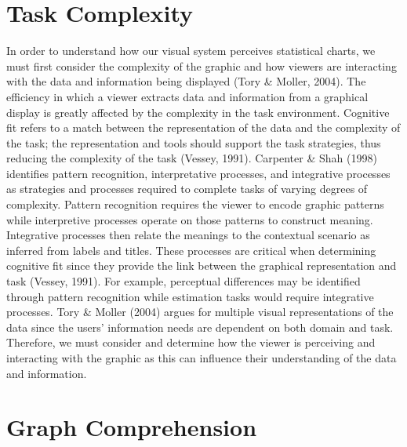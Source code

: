 \documentclass[print]{nuthesis}
\begin{document}
\hypertarget{task-complexity}{%
\section{Task Complexity}\label{task-complexity}}

In order to understand how our visual system perceives statistical charts, we must first consider the complexity of the graphic and how viewers are interacting with the data and information being displayed (Tory \& Moller, 2004).
The efficiency in which a viewer extracts data and information from a graphical display is greatly affected by the complexity in the task environment.
Cognitive fit refers to a match between the representation of the data and the complexity of the task; the representation and tools should support the task strategies, thus reducing the complexity of the task (Vessey, 1991).
Carpenter \& Shah (1998) identifies pattern recognition, interpretative processes, and integrative processes as strategies and processes required to complete tasks of varying degrees of complexity.
Pattern recognition requires the viewer to encode graphic patterns while interpretive processes operate on those patterns to construct meaning.
Integrative processes then relate the meanings to the contextual scenario as inferred from labels and titles.
These processes are critical when determining cognitive fit since they provide the link between the graphical representation and task (Vessey, 1991).
For example, perceptual differences may be identified through pattern recognition while estimation tasks would require integrative processes.
Tory \& Moller (2004) argues for multiple visual representations of the data since the users' information needs are dependent on both domain and task.
Therefore, we must consider and determine how the viewer is perceiving and interacting with the graphic as this can influence their understanding of the data and information.

\hypertarget{graph-comprehension}{%
\section{Graph Comprehension}\label{graph-comprehension}}
\end{document}
